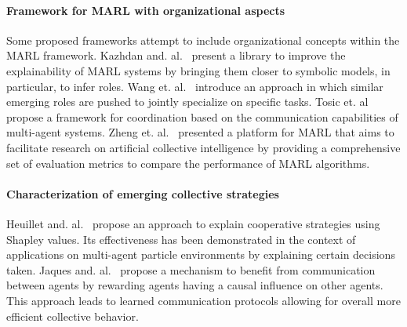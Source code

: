 \documentclass[runningheads]{llncs}
\begin{document}












\paragraph{\textbf{Framework for MARL with organizational aspects}}
%
Some proposed frameworks attempt to include organizational concepts within the MARL framework.
Kazhdan and. al.~\cite{Kazhdan2020} present a library to improve the explainability of MARL systems by bringing them closer to symbolic models, in particular, to infer roles.%
%
Wang et. al.~\cite{Wang2020} introduce an approach in which similar emerging roles are pushed to jointly specialize on specific tasks.
%
Tosic et. al~\cite{Tosic2010} propose a framework for coordination based on the communication capabilities of multi-agent systems.
%
Zheng et. al.~\cite{Zheng2018} presented a platform for MARL that aims to facilitate research on artificial collective intelligence by providing a comprehensive set of evaluation metrics to compare the performance of MARL algorithms.

\paragraph{\textbf{Characterization of emerging collective strategies}}
%
Heuillet and. al.~\cite{Heuillet2022} propose an approach to explain cooperative strategies using Shapley values. Its effectiveness has been demonstrated in the context of applications on multi-agent particle environments by explaining certain decisions taken.
%
Jaques and. al.~\cite{Jaques2019} propose a mechanism to benefit from communication between agents by rewarding agents having a causal influence on other agents. This approach leads to learned communication protocols allowing for overall more efficient collective behavior.
\end{document}
